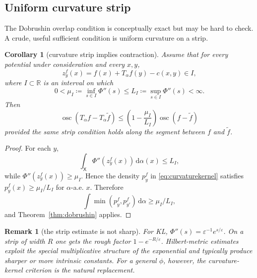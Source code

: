 \documentclass[11pt]{article}
\newtheorem{corollary}[theorem]{Corollary}
\newtheorem{remark}[theorem]{Remark}
\newcommand{\R}{\mathbb{R}}
\newcommand{\X}{\mathsf{X}}
\newcommand{\eps}{\varepsilon}
\newcommand{\dd}{\,\mathrm{d}}
\newcommand{\osc}{\operatorname{osc}}
\newcommand{\defeq}{\coloneqq}
\begin{document}
\subsection{Uniform curvature strip}

The Dobrushin overlap condition is conceptually exact but may be hard to check.
A crude, useful sufficient condition is uniform curvature on a strip.

\begin{corollary}[curvature strip implies contraction]\label{cor:strip}
Assume that for every potential under consideration and every $x,y$,
\begin{equation}\label{eq:strip}
  z_y^f(x)=f(x)+T_\alpha f(y)-c(x,y)\in I,
\end{equation}
where $I\subset\R$ is an interval on which
\begin{equation}\label{eq:muL}
  0<\mu_I\defeq\inf_{s\in I}\Phi''(s)
  \leq
  L_I\defeq\sup_{s\in I}\Phi''(s)<\infty.
\end{equation}
Then
\begin{equation}\label{eq:stripfactor}
  \osc(T_\alpha f-T_\alpha\tilde f)
  \leq
  \left(1-\frac{\mu_I}{L_I}\right)
  \osc(f-\tilde f)
\end{equation}
provided the same strip condition holds along the segment between $f$ and
$\tilde f$.
\end{corollary}

\begin{proof}
For each $y$,
\begin{equation*}
  \int_\X \Phi''(z_y^f(x))\dd\alpha(x)\leq L_I,
\end{equation*}
while $\Phi''(z_y^f(x))\geq \mu_I$.  Hence the density
$p_y^f$ in \eqref{eq:curvaturekernel} satisfies
$p_y^f(x)\geq \mu_I/L_I$ for $\alpha$-a.e. $x$.  Therefore
\begin{equation*}
  \int \min(p_y^f,p_{y'}^f)\dd\alpha\geq \mu_I/L_I,
\end{equation*}
and Theorem~\ref{thm:dobrushin} applies.
\end{proof}

\begin{remark}[the strip estimate is not sharp]
For KL, $\Phi''(s)=\eps^{-1}e^{s/\eps}$.  On a strip of width $R$ one gets the
rough factor $1-e^{-R/\eps}$.  Hilbert-metric estimates exploit the special
multiplicative structure of the exponential and typically produce sharper or
more intrinsic constants.  For a general $\phi$, however, the curvature-kernel
criterion is the natural replacement.
\end{remark}
\end{document}
